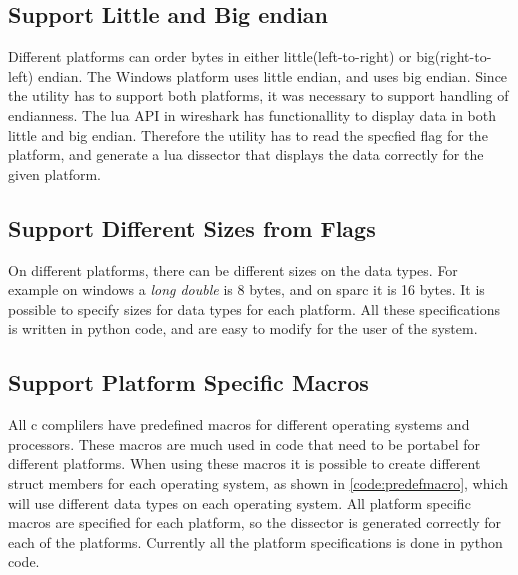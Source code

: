 \subsection{Support Little and Big \Gls{endian}}
Different platforms can order bytes in either little(left-to-right) or 
big(right-to-left) \gls{endian}. The \Gls{Windows} platform uses little \gls{endian}, and  
uses big \gls{endian}. Since the \gls{utility} has to support both platforms, it was 
necessary to support handling of \gls{endianness}. The \Gls{lua} API in wireshark has 
functionallity to display data in both little and big \gls{endian}. Therefore the 
\gls{utility} has to read the specfied flag for the platform, and generate a \Gls{lua} 
\gls{dissector} that displays the data correctly for the given platform.

\subsection{Support Different Sizes from Flags}
On different platforms, there can be different sizes on the data types. For 
example on windows a \emph{long double} is 8 bytes, and on sparc it is 16 
bytes. It is possible to specify sizes for data types for each platform. All 
these specifications is written in python code, and are easy to modify for the 
user of the system.

\subsection{Support Platform Specific Macros}
All c complilers have predefined macros for different operating systems and 
processors. These macros are much used in code that need to be portabel for 
different platforms. When using these macros it is possible to create 
different struct members for each operating system, as shown in 
\autoref{code:predefmacro}, which will use different data types on each 
operating system. All platform specific macros are specified for each 
platform, so the dissector is generated correctly for each of the platforms. 
Currently all the platform specifications is done in python code.



